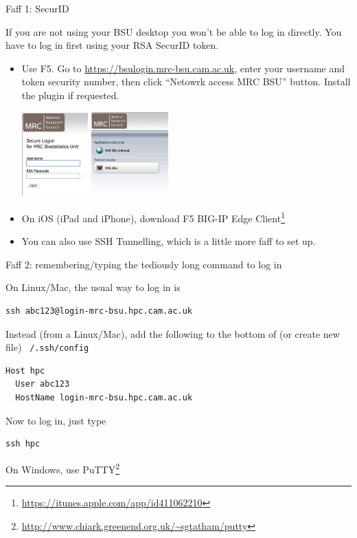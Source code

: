 \documentclass[t,10pt]{beamer}
\let\oldfootnote\footnote
\renewcommand\footnote[1][]{\oldfootnote[frame,#1]}
\begin{document}
\begin{frame}[fragile]{Faff 1: SecurID}

If you are not using \alert{your BSU desktop} you won't be able to log in directly. You have to log in first using your RSA SecurID token.

\begin{itemize}
\item Use \alert{F5}. Go to \url{https://bsulogin.mrc-bsu.cam.ac.uk}, enter your username and token security number, then click ``Netowrk access MRC BSU'' button. Install the plugin if requested.

\bigskip
\includegraphics[width=0.2\textwidth]{f5-screen1.png}
\hspace{1em}
\includegraphics[width=0.235\textwidth]{f5-screen2.png}
\bigskip

\item On iOS (iPad and iPhone), download \alert{F5 BIG-IP Edge Client}\footnote{\url{https://itunes.apple.com/app/id411062210}}

\item You can also use \alert{SSH Tunnelling}, which is a little more faff to set up.
\end{itemize}

\end{frame}


\begin{frame}[fragile]{Faff 2: remembering/typing the tediously long command to log in}

On \alert{Linux/Mac}, the usual way to log in is

\begin{verbatim}
ssh abc123@login-mrc-bsu.hpc.cam.ac.uk
\end{verbatim}

Instead (from a Linux/Mac), add the following to the bottom of (or create new file) \texttt{~/.ssh/config}

\begin{verbatim}
Host hpc
  User abc123
  HostName login-mrc-bsu.hpc.cam.ac.uk
\end{verbatim}

Now to log in, just type

\begin{verbatim}
ssh hpc
\end{verbatim}

On \alert{Windows}, use PuTTY\footnote{\url{http://www.chiark.greenend.org.uk/~sgtatham/putty}}
\end{frame}
\end{document}
